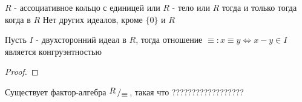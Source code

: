 \documentclass[../main/document.tex]{subfiles}
\begin{document}
\begin{exm}

\end{exm}
\begin{thm}
$R$ - ассоциативное кольцо с единицей или $R$ - тело или $R$ тогда и только тогда когда в $R$ Нет других идеалов, кроме $\{0\}$ и $R$
\end{thm}
\begin{dfn}

\end{dfn}
\begin{thm}
Пусть $I$ - двухсторонний идеал в $R$, тогда отношение $\equiv: x\equiv y \Leftrightarrow x-y\in I$ является конгруэнтностью
\begin{proof}

\end{proof}
\end{thm}
\begin{cnsq}
Существует фактор-алгебра $\bigslant{R}{\equiv}$, такая что ??????????????????
\end{cnsq}
\end{document}
